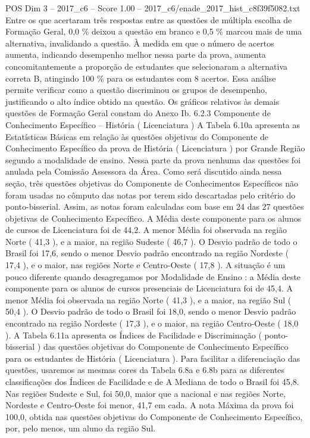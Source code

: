 \begin{textsample}{POS Dim 3 – 2017\_c6 – Score 1.00 – 2017\_c6/enade\_2017\_hist\_c8f39f5082.txt}
Entre os que acertaram três respostas entre as questões de múltipla escolha de Formação Geral, 0,0 \% deixou a questão em branco e 0,5 \% marcou mais de uma alternativa, invalidando a questão.
À medida em que o número de acertos aumenta, indicando desempenho melhor nessa parte da prova, aumenta concomitantemente a proporção de estudantes que selecionaram a alternativa correta B, atingindo 100 \% para os estudantes com 8 acertos.
Essa análise permite verificar como a questão discriminou os grupos de desempenho, justificando o alto índice obtido na questão.
Os gráficos relativos às demais questões de Formação Geral constam do Anexo Ib. 6.2.3 Componente de Conhecimento Específico – História ( Licenciatura ) A Tabela 6.10a apresenta as Estatísticas Básicas em relação às questões objetivas do Componente de Conhecimento Específico da prova de História ( Licenciatura ) por Grande Região segundo a modalidade de ensino.
Nessa parte da prova nenhuma das questões foi anulada pela Comissão Assessora da Área.
Como será discutido ainda nessa seção, três questões objetivas do Componente de Conhecimentos Específicos não foram usadas no cômputo das notas por terem sido descartadas pelo critério do ponto-bisserial.
Assim, as notas foram calculadas com base em 24 das 27 questões objetivas de Conhecimento Específico.
A Média deste componente para os alunos de cursos de Licenciatura foi de 44,2.
A menor Média foi observada na região Norte ( 41,3 ), e a maior, na região Sudeste ( 46,7 ).
O Desvio padrão de todo o Brasil foi 17,6, sendo o menor Desvio padrão encontrado na região Nordeste ( 17,4 ), e o maior, nas regiões Norte e Centro-Oeste ( 17,8 ).
A situação é um pouco diferente quando desagregamos por Modalidade de Ensino : a Média deste componente para os alunos de cursos presenciais de Licenciatura foi de 45,4.
A menor Média foi observada na região Norte ( 41,3 ), e a maior, na região Sul ( 50,4 ).
O Desvio padrão de todo o Brasil foi 18,0, sendo o menor Desvio padrão encontrado na região Nordeste ( 17,3 ), e o maior, na região Centro-Oeste ( 18,0 ).
A Tabela 6.11a apresenta os Índices de Facilidade e Discriminação ( ponto-bisserial ) das questões objetivas do Componente de Conhecimento Específico para os estudantes de História ( Licenciatura ).
Para facilitar a diferenciação das questões, usaremos as mesmas cores da Tabela 6.8a e 6.8b para as diferentes classificações dos Índices de Facilidade e de A Mediana de todo o Brasil foi 45,8.
Nas regiões Sudeste e Sul, foi 50,0, maior que a nacional e nas regiões Norte, Nordeste e Centro-Oeste foi menor, 41,7 em cada.
A nota Máxima da prova foi 100,0, obtida nas questões objetivas do Componente de Conhecimento Específico, por, pelo menos, um aluno da região Sul.

\end{textsample}
